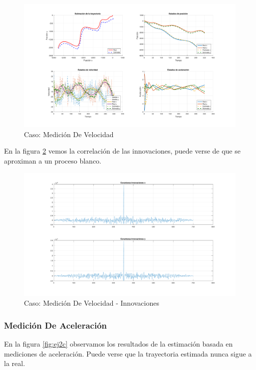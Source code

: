 		\begin{figure}[H]
			\centering
			\includegraphics[width=1.0\textwidth,keepaspectratio]{Figuras/graf_ej2b.pdf}
			\caption{Caso: Medición De Velocidad}
			\label{fig:ej2b}
		\end{figure}
		
		En la figura \ref{fig:ej2b_innov} vemos la correlación de las innovaciones, puede verse de que se aproximan a un proceso blanco.
		
		\begin{figure}[H]
			\centering
			\includegraphics[width=1.0\textwidth,keepaspectratio]{Figuras/covinn_ej2b.pdf}
			\caption{Caso: Medición De Velocidad - Innovaciones}
			\label{fig:ej2b_innov}
		\end{figure}
			
		\subsubsection{Medición De Aceleración}
		
		En la figura \ref{fig:ej2c} observamos los resultados de la estimación basada en mediciones de aceleración. Puede verse que la trayectoria estimada nunca sigue a la real.
		
